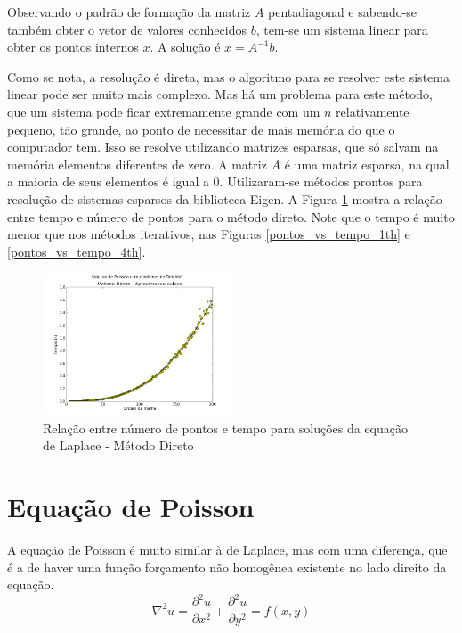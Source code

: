 \documentclass[journal]{IEEEtran}
\begin{document}
Observando o padrão de formação da matriz $A$ pentadiagonal e sabendo-se também obter o vetor de valores conhecidos $b$, tem-se um sistema linear para obter os pontos internos $x$. A solução é $x=A^{-1}b$.

Como se nota, a resolução é direta, mas o algoritmo para se resolver este sistema linear pode ser muito mais complexo. Mas há um problema para este método, que um sistema pode ficar extremamente grande com um $n$ relativamente pequeno, tão grande, ao ponto de necessitar de mais memória do que o computador tem. Isso se resolve utilizando matrizes esparsas, que só salvam na memória elementos diferentes de zero. A matriz $A$ é uma matriz esparsa, na qual a maioria de seus elementos é igual a 0. Utilizaram-se métodos prontos para resolução de sistemas esparsos da biblioteca Eigen. A Figura \ref{pontos_vs_tempo_direto} mostra a relação entre tempo e número de pontos para o método direto. Note que o tempo é muito menor que nos métodos iterativos, nas Figuras \ref{pontos_vs_tempo_1th} e \ref{pontos_vs_tempo_4th}.

\begin{figure}[ht!]
\centering
\includegraphics[width = 0.5\textwidth]{figures/poisson_dirichlet_metodo_direto.png}
\caption{Relação entre número de pontos e tempo para soluções da equação de Laplace - Método Direto\label{pontos_vs_tempo_direto}}
\end{figure}


\section{Equação de Poisson}

A equação de Poisson é muito similar à de Laplace, mas com uma diferença, que é a de haver uma função forçamento não homogênea existente no lado direito da equação.
\begin{equation}
  \nabla^2 u=\frac{\partial^2 u}{\partial x^2}+\frac{\partial^2 u}{\partial y^2}=f(x,y)\label{poisson}
\end{equation}
\end{document}
